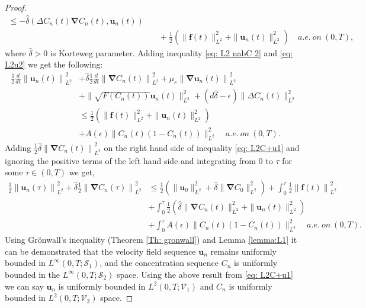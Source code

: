 \documentclass[final,3p,times]{elsarticle}
\theoremstyle{plain}
\theoremstyle{remark}
\theoremstyle{plain}
\theoremstyle{remark}
\begin{document}
\begin{proof}
\begin{align}
\le -\hat{\delta} \left( \Delta C_n\left(t\right) \boldsymbol{\nabla} C_n\left(t\right), \mathbf{u}_n\left(t\right) \right) \nonumber \\
&\quad + \frac{1}{2}\left(\| \mathbf{f}\left(t\right)\|_{L^2}^2+\|\mathbf{u}_n\left(t\right) \|_{L^2}^2\right)\quad a.e. \ on \ \left(0,T\right), \label{eq: L2u2}
\end{align}
where $\hat \delta > 0$ is Korteweg parameter.
Adding inequality \eqref{eq: L2 nabC 2} and \eqref{eq: L2u2} we get the following:
\begin{align}
\frac{1}{2} \frac{d}{dt} \left\| \mathbf{u}_n\left(t\right) \right\|_{L^2}^2 
& + \hat{\delta} \frac{1}{2} \frac{d}{dt} \left\| \boldsymbol{\nabla} C_n\left(t\right) \right\|_{L^2}^2+\mu_e \left\| \boldsymbol{\nabla} \mathbf{u}_n\left(t\right) \right\|_{L^2}^2 \nonumber \\ 
& + \|\sqrt{ F\left(C_n\left(t\right)\right) }\mathbf u_n\left(t\right) \|_{L^2}^2 
+ \left(d\hat{\delta}-\epsilon\right)\|\Delta C_n\left(t\right)\|_{L^2}^2 \nonumber \\ 
& \leq \frac{1}{2}\left(\| \mathbf{f}\left(t\right)\|_{L^2}^2+\|\mathbf{u}_n\left(t\right) \|_{L^2}^2\right) \nonumber \\ 
& + A\left(\epsilon\right)\|C_n\left(t\right)\left(1-C_n\left(t\right)\right)\|_{L^2}^2 \quad a.e. \ on \ \left(0,T\right). \label{eq: L2C+u1}
\end{align}
Adding $\frac{1}{2}\hat{\delta}\left\|\boldsymbol{\nabla} C_n\left(t\right) \right\|_{L^2}^2  $ on the right hand side of inequality \eqref{eq: L2C+u1} and ignoring the positive terms of the left hand side and integrating from $0$ to $\tau$ for some $\tau \in \left(0,T\right)$ we get,
\begin{align}
\frac{1}{2} \left\| \mathbf{u}_n\left(\tau\right) \right\|_{L^2}^2 + \hat{\delta} \frac{1}{2} \left\| \boldsymbol{\nabla} C_n\left(\tau\right) \right\|_{L^2}^2
& \leq  \frac{1}{2}\left(\|\mathbf{u}_0\|_{L^2}^2+\hat \delta \|\boldsymbol{\nabla} C_0\|^2_{L^2}\right)+\int_0^\tau \frac{1}{2} \left\| \mathbf{f}\left(t\right) \right\|_{L^2}^2 \nonumber\\
& + \int_0^\tau \frac{1}{2}\left(\hat \delta \|\boldsymbol{\nabla} C_n\left(t\right)\|_{L^2}^2 + \| \mathbf{u}_n\left(t\right) \|_{L^2}^2\right) \nonumber \\ 
& + \int_0^\tau A\left(\epsilon\right)\|C_n\left(t\right)\left(1-C_n\left(t\right)\right)\|_{L^2}^2 \quad a.e. \ on \ \left(0,T\right). \label{eq: L2C+u}
\end{align}
Using Gr\"onwall’s inequality (Theorem \ref{Th: gronwall}) and Lemma \ref{lemma:L1} it can be demonstrated that the velocity field sequence $\mathbf{u}_n$ remains uniformly bounded in $L^\infty\left(0, T;\mathscr S_1\right)$, and the concentration sequence $C_n$ is uniformly bounded in the $L^\infty\left(0, T;\mathscr S_2\right)$ space.
Using the above result from \eqref{eq: L2C+u1} we can say $\mathbf u_n$ is uniformly bounded in $L^2\left(0,T;\mathscr V_1\right)$ and $C_n$ is uniformly bounded in $L^2\left(0,T;\mathscr V_2\right)$ space.
\end{proof}
\end{document}
